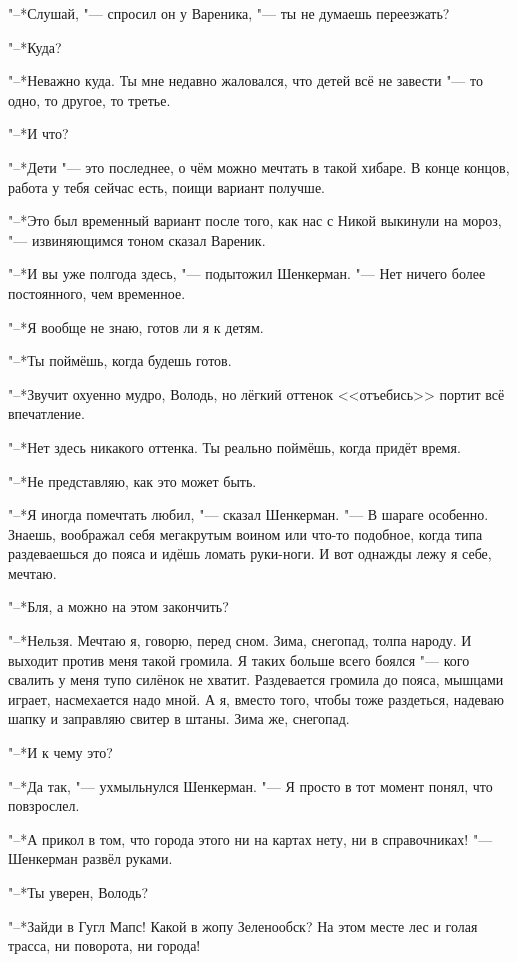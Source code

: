 "--*Слушай, "--- спросил он у Вареника, "--- ты не думаешь переезжать?

"--*Куда?

"--*Неважно куда.
Ты мне недавно жаловался, что детей всё не завести "--- то одно, то другое, то третье.

"--*И что?

"--*Дети "--- это последнее, о чём можно мечтать в такой хибаре.
В конце концов, работа у тебя сейчас есть, поищи вариант получше.

"--*Это был временный вариант после того, как нас с Никой выкинули на мороз, "--- извиняющимся тоном сказал Вареник.

"--*И вы уже полгода здесь, "--- подытожил Шенкерман.
"--- Нет ничего более постоянного, чем временное.

"--*Я вообще не знаю, готов ли я к детям.

"--*Ты поймёшь, когда будешь готов.

"--*Звучит охуенно мудро, Володь, но лёгкий оттенок <<отъебись>> портит всё впечатление.

"--*Нет здесь никакого оттенка.
Ты реально поймёшь, когда придёт время.

"--*Не представляю, как это может быть.

"--*Я иногда помечтать любил, "--- сказал Шенкерман.
"--- В шараге особенно.
Знаешь, воображал себя мегакрутым воином или что-то подобное, когда типа раздеваешься до пояса и идёшь ломать руки-ноги.
И вот однажды лежу я себе, мечтаю.

"--*Бля, а можно на этом закончить?

"--*Нельзя.
Мечтаю я, говорю, перед сном.
Зима, снегопад, толпа народу.
И выходит против меня такой громила.
Я таких больше всего боялся "--- кого свалить у меня тупо силёнок не хватит.
Раздевается громила до пояса, мышцами играет, насмехается надо мной.
А я, вместо того, чтобы тоже раздеться, надеваю шапку и заправляю свитер в штаны.
Зима же, снегопад.

"--*И к чему это?

"--*Да так, "--- ухмыльнулся Шенкерман.
"--- Я просто в тот момент понял, что повзрослел.

\asterism

\textspace

"--*А прикол в том, что города этого ни на картах нету, ни в справочниках! "--- Шенкерман развёл руками.

"--*Ты уверен, Володь?

"--*Зайди в Гугл Мапс!
Какой в жопу Зеленообск?
На этом месте лес и голая трасса, ни поворота, ни города!

